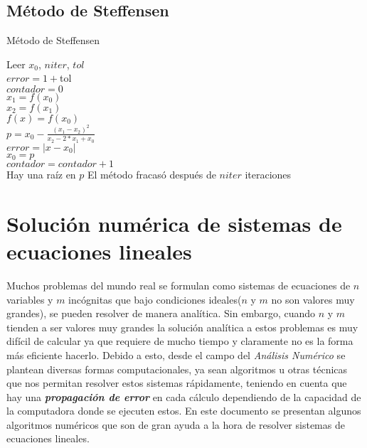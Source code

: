 \documentclass[12pt]{article}
\begin{document}
    \subsection{Método de Steffensen}
    \begin{algorithm}[H]
        \caption{Método de Steffensen}
        \SetAlgoLined
        Leer $x_0$, $niter$, $tol$\\

        $error = 1 + $tol\\
        $contador = 0$\\
        {
            $x_1 = f(x_0)$\\
            $x_2 = f(x_1)$\\
            $f(x) = f(x_0)$\\
            $p = x_0 - \frac{(x_1-x_2)^2}{x_2-2*x_1+x_0}$\\
            $error = |x - x_0|$\\
            $x_0 = p$\\
            $contador = contador + 1$\\
        }
        {Hay una raíz en $p$}
        {El método fracasó después de $niter$ iteraciones}
    \end{algorithm}

    \section{Solución numérica de sistemas de ecuaciones lineales}
	Muchos problemas del mundo real se formulan como sistemas de ecuaciones de $n$ variables y $m$ incógnitas que bajo condiciones ideales($n$ y $m$ no son valores muy grandes), se pueden resolver de manera analítica. Sin embargo, cuando $n$ y $m$ tienden a ser valores muy grandes la solución analítica a estos problemas es muy difícil de calcular ya que requiere de mucho tiempo y claramente no es la forma más eficiente hacerlo. Debido a esto, desde el campo del \textit{Análisis Numérico} se plantean diversas formas computacionales, ya sean algoritmos u otras técnicas que nos permitan resolver estos sistemas rápidamente, teniendo en cuenta que hay una \textit{\textbf{propagación de error}} en cada cálculo dependiendo de la capacidad de la computadora donde se ejecuten estos.
	En este documento se presentan algunos algoritmos numéricos que son de gran ayuda a la hora de resolver sistemas de ecuaciones lineales.
    
\end{document}
